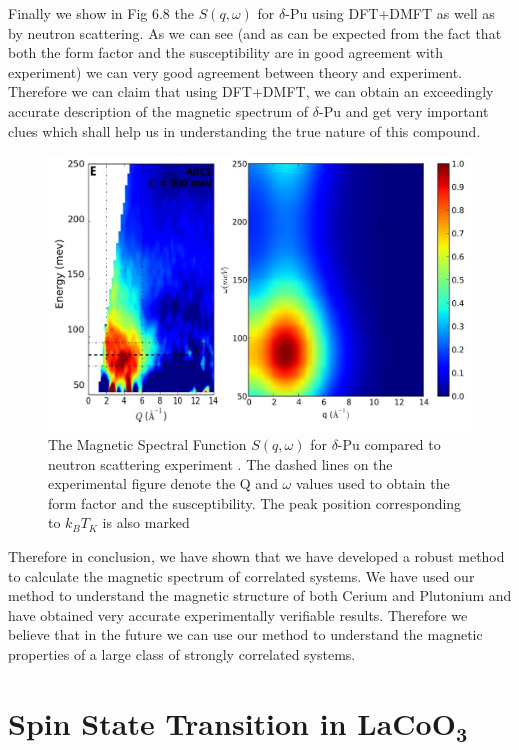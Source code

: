 \documentclass[10pt]{ruthesis}
\begin{document}
{Finally we show in Fig 6.8 the $S(q,\omega)$ for $\delta$-Pu using DFT+DMFT as well as by neutron scattering. As we can see (and as can be expected from the fact that both the form factor and the susceptibility are in good agreement with experiment) we can very good agreement between theory and experiment. Therefore we can claim that using DFT+DMFT, we can obtain an exceedingly accurate description of the magnetic spectrum of $\delta$-Pu and get very important clues which shall help us in understanding the true nature of this compound.
\begin{figure}[H]
\begin{center}
\includegraphics[width=\columnwidth]{Sq_Pu_joined.jpg}
\caption{ The Magnetic Spectral Function $S(q,\omega)$  for $\delta$-Pu compared to neutron scattering experiment \cite{Me_Pu}. The dashed lines on the experimental figure denote the Q and $\omega$ values used to obtain the form factor and the susceptibility. The peak position corresponding to $k_B T_K$ is also marked \label{Sq_Pu_fig} }
\end{center}

\end{figure}


Therefore in conclusion, we have shown that we have developed a robust method to calculate the magnetic spectrum of correlated systems. We have used our method to understand the magnetic structure of both Cerium and Plutonium and have obtained very accurate experimentally verifiable results. Therefore we believe that in the future we can use our method to understand the magnetic properties of a large class of strongly correlated systems.



\pagebreak
\chapter{Spin State Transition in $\mathbf{LaCoO_3}$}

}
\end{document}
